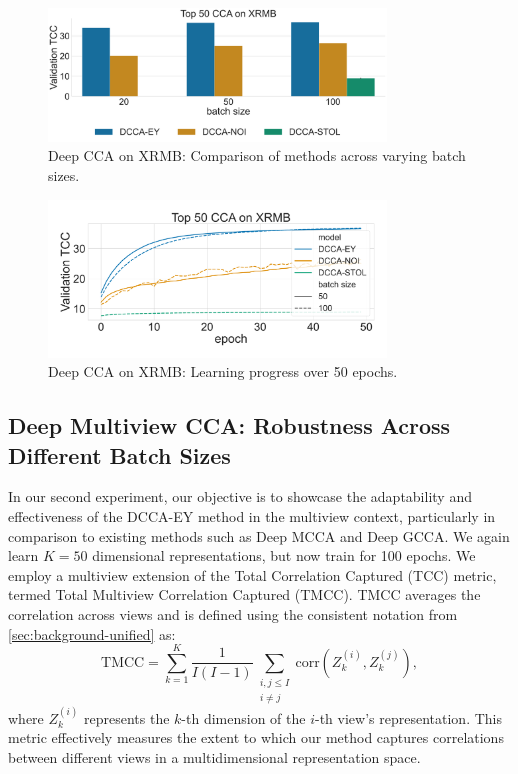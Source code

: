 \begin{figure}
    \centering
    \includegraphics[width=0.8\textwidth]{figures/DCCA/XRMB_models_different_batch_sizes}
    \caption{Deep CCA on XRMB: Comparison of methods across varying batch sizes.}
    \label{fig:corr_xrmb}
\end{figure}

\begin{figure}
    \centering
    \includegraphics[width=0.8\textwidth]{figures/DCCA/XRMB_allbatchsizes_pcc}
    \caption{Deep CCA on XRMB: Learning progress over 50 epochs.}
    \label{fig:lr_xrmb}
\end{figure}

\subsection{Deep Multiview CCA: Robustness Across Different Batch Sizes}
In our second experiment, our objective is to showcase the adaptability and effectiveness of the DCCA-EY method in the multiview context, particularly in comparison to existing methods such as Deep MCCA and Deep GCCA.
We again learn $K=50$ dimensional representations, but now train for 100 epochs.
We employ a multiview extension of the Total Correlation Captured (TCC) metric, termed Total Multiview Correlation Captured (TMCC). TMCC averages the correlation across views and is defined using the consistent notation from \cref{sec:background-unified} as:
\[
    \text{TMCC} = \sum_{k=1}^{K} \frac{1}{I(I-1)} \sum_{\substack{i,j \leq I \\ i \neq j}} \text{corr}(Z_k^{(i)}, Z_k^{(j)}),
\]
where \( Z_k^{(i)} \) represents the \( k \)-th dimension of the \( i \)-th view's representation.
This metric effectively measures the extent to which our method captures correlations between different views in a multidimensional representation space.


